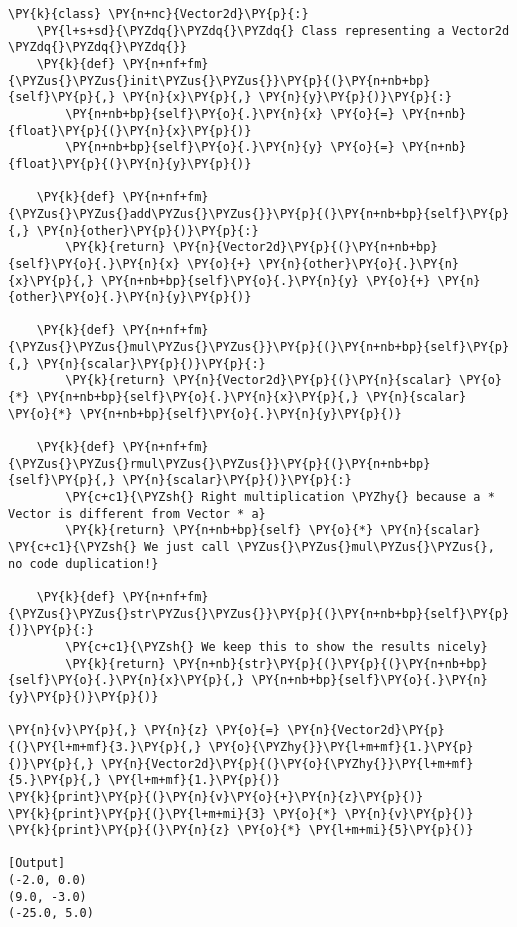 \begin{Verbatim}[label=\makebox{\url{https://bitbucket.org/lbaldini/programming/src/tip/snippets/vector2d\_math.py}},commandchars=\\\{\}]
\PY{k}{class} \PY{n+nc}{Vector2d}\PY{p}{:}
    \PY{l+s+sd}{\PYZdq{}\PYZdq{}\PYZdq{} Class representing a Vector2d \PYZdq{}\PYZdq{}\PYZdq{}}   
    \PY{k}{def} \PY{n+nf+fm}{\PYZus{}\PYZus{}init\PYZus{}\PYZus{}}\PY{p}{(}\PY{n+nb+bp}{self}\PY{p}{,} \PY{n}{x}\PY{p}{,} \PY{n}{y}\PY{p}{)}\PY{p}{:}
        \PY{n+nb+bp}{self}\PY{o}{.}\PY{n}{x} \PY{o}{=} \PY{n+nb}{float}\PY{p}{(}\PY{n}{x}\PY{p}{)}
        \PY{n+nb+bp}{self}\PY{o}{.}\PY{n}{y} \PY{o}{=} \PY{n+nb}{float}\PY{p}{(}\PY{n}{y}\PY{p}{)}
   
    \PY{k}{def} \PY{n+nf+fm}{\PYZus{}\PYZus{}add\PYZus{}\PYZus{}}\PY{p}{(}\PY{n+nb+bp}{self}\PY{p}{,} \PY{n}{other}\PY{p}{)}\PY{p}{:}
        \PY{k}{return} \PY{n}{Vector2d}\PY{p}{(}\PY{n+nb+bp}{self}\PY{o}{.}\PY{n}{x} \PY{o}{+} \PY{n}{other}\PY{o}{.}\PY{n}{x}\PY{p}{,} \PY{n+nb+bp}{self}\PY{o}{.}\PY{n}{y} \PY{o}{+} \PY{n}{other}\PY{o}{.}\PY{n}{y}\PY{p}{)}
    
    \PY{k}{def} \PY{n+nf+fm}{\PYZus{}\PYZus{}mul\PYZus{}\PYZus{}}\PY{p}{(}\PY{n+nb+bp}{self}\PY{p}{,} \PY{n}{scalar}\PY{p}{)}\PY{p}{:}
        \PY{k}{return} \PY{n}{Vector2d}\PY{p}{(}\PY{n}{scalar} \PY{o}{*} \PY{n+nb+bp}{self}\PY{o}{.}\PY{n}{x}\PY{p}{,} \PY{n}{scalar} \PY{o}{*} \PY{n+nb+bp}{self}\PY{o}{.}\PY{n}{y}\PY{p}{)}
        
    \PY{k}{def} \PY{n+nf+fm}{\PYZus{}\PYZus{}rmul\PYZus{}\PYZus{}}\PY{p}{(}\PY{n+nb+bp}{self}\PY{p}{,} \PY{n}{scalar}\PY{p}{)}\PY{p}{:}
        \PY{c+c1}{\PYZsh{} Right multiplication \PYZhy{} because a * Vector is different from Vector * a}
        \PY{k}{return} \PY{n+nb+bp}{self} \PY{o}{*} \PY{n}{scalar} \PY{c+c1}{\PYZsh{} We just call \PYZus{}\PYZus{}mul\PYZus{}\PYZus{}, no code duplication!}
        
    \PY{k}{def} \PY{n+nf+fm}{\PYZus{}\PYZus{}str\PYZus{}\PYZus{}}\PY{p}{(}\PY{n+nb+bp}{self}\PY{p}{)}\PY{p}{:}
        \PY{c+c1}{\PYZsh{} We keep this to show the results nicely}
        \PY{k}{return} \PY{n+nb}{str}\PY{p}{(}\PY{p}{(}\PY{n+nb+bp}{self}\PY{o}{.}\PY{n}{x}\PY{p}{,} \PY{n+nb+bp}{self}\PY{o}{.}\PY{n}{y}\PY{p}{)}\PY{p}{)}
     
\PY{n}{v}\PY{p}{,} \PY{n}{z} \PY{o}{=} \PY{n}{Vector2d}\PY{p}{(}\PY{l+m+mf}{3.}\PY{p}{,} \PY{o}{\PYZhy{}}\PY{l+m+mf}{1.}\PY{p}{)}\PY{p}{,} \PY{n}{Vector2d}\PY{p}{(}\PY{o}{\PYZhy{}}\PY{l+m+mf}{5.}\PY{p}{,} \PY{l+m+mf}{1.}\PY{p}{)}
\PY{k}{print}\PY{p}{(}\PY{n}{v}\PY{o}{+}\PY{n}{z}\PY{p}{)}
\PY{k}{print}\PY{p}{(}\PY{l+m+mi}{3} \PY{o}{*} \PY{n}{v}\PY{p}{)}
\PY{k}{print}\PY{p}{(}\PY{n}{z} \PY{o}{*} \PY{l+m+mi}{5}\PY{p}{)}

[Output]
(-2.0, 0.0)
(9.0, -3.0)
(-25.0, 5.0)
\end{Verbatim}